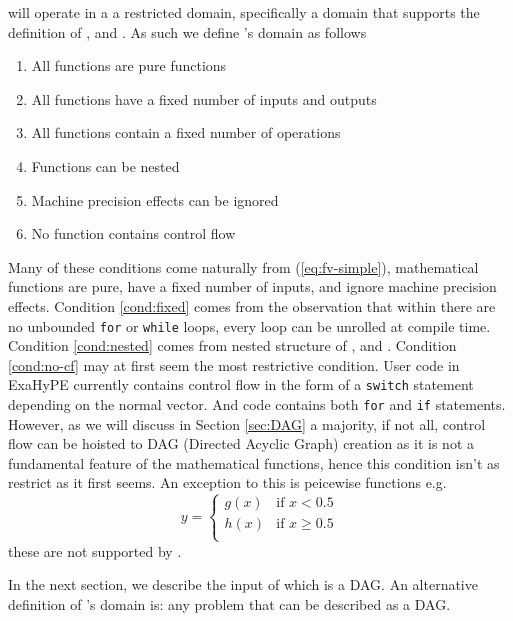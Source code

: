 \phlat will operate in a a restricted domain, specifically a domain that supports the definition of ,  and .
As such we define \phlat{}'s domain as follows
\begin{enumerate}
    \item All functions are pure functions
    \item All functions have a fixed number of inputs and outputs
    \item All functions contain a fixed number of operations \label{cond:fixed}
    \item Functions can be nested \label{cond:nested}
    \item Machine precision effects can be ignored
    \item No function contains control flow \label{cond:no-cf}
\end{enumerate}
Many of these conditions come naturally from (\ref{eq:fv-simple}), mathematical functions are pure, have a fixed number of inputs, and ignore machine precision effects.
Condition \ref{cond:fixed} comes from the observation that within  there are no unbounded \lstinline{for} or \lstinline{while} loops, every loop can be unrolled at compile time.
Condition \ref{cond:nested} comes from nested structure of ,  and .
Condition \ref{cond:no-cf} may at first seem the most restrictive condition.
User code in ExaHyPE currently contains control flow in the form of a \lstinline{switch} statement depending on the normal vector.
And  code contains both \lstinline{for} and \lstinline{if} statements.
However, as we will discuss in Section \ref{sec:DAG} a majority, if not all, control flow can be hoisted to DAG (Directed Acyclic Graph) creation as it is not a fundamental feature of the mathematical functions, hence this condition isn't as restrict as it first seems.
An exception to this is peicewise functions e.g.
\[
    y = \begin{cases} g(x)  & \text{if } x<0.5 \\  h(x)  & \text{if } x\geq 0.5 \\\end{cases}
\]
these are not supported by \phlat.

In the next section, we describe the input of \phlat which is a DAG.
An alternative definition of \phlat{}'s domain is: any problem that can be described as a DAG.

